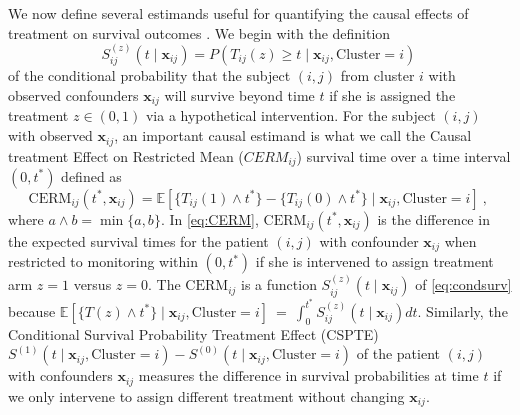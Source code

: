 \documentclass[aoas]{imsart}
\theoremstyle{plain}
\theoremstyle{definition}
\begin{document}
We now define several estimands useful for quantifying the causal  effects of treatment  on survival outcomes \parencite{Andersen2021observational}. %
We begin with the definition 
\begin{equation}
S_{ij}^{(z)}(t \mid   \mathbf{x}_{ij}) = P(T_{ij}(z) \geq t \mid   \mathbf{x}_{ij}, \text{Cluster}=i) \hspace{2pt}
\label{eq:condsurv}
\end{equation}
of the conditional probability that the subject $(i,j)$ from cluster $i$ with observed confounders $\mathbf{x}_{ij}$ will survive beyond time $t$ 
if she is  assigned the treatment $z\in (0,1)$ via a hypothetical intervention. 
For the subject $(i,j)$ with observed $\mathbf{x}_{ij}$, an important causal estimand is what we call the Causal treatment Effect on Restricted Mean ($CERM_{ij}$) survival time over a time interval $(0,t^*)$ defined as 
\begin{equation}
\text{CERM}_{ij}(t^*, \mathbf{x}_{ij}) = \mathbb{E}[\{T_{ij}(1)\wedge t^*\} - \{T_{ij}(0)\wedge t^*\} \mid   \mathbf{x}_{ij}, \text{Cluster}=i]\ ,
\hspace{2pt}
\label{eq:CERM}
\end{equation}
where $a\wedge b=\min\{a,b\}$. In \eqref{eq:CERM}, $\text{CERM}_{ij}(t^*, \mathbf{x}_{ij})$  is the difference  in the expected survival times for the patient $(i,j)$ with confounder $\mathbf{x}_{ij}$ when 
restricted to monitoring within $(0,t^*)$ if she is intervened to assign treatment arm $z=1$ versus $z=0$. 
The $\text{CERM}_{ij}$  is a function $S_{ij}^{(z)}(t \mid   \mathbf{x}_{ij})$ of \eqref{eq:condsurv} because $\mathbb{E}[\{T(z) \wedge t^*\}  \mid   \mathbf{x}_{ij}, \text{Cluster}=i]\   
=\ \int_0^{t^*} S_{ij}^{(z)}(t \mid   \mathbf{x}_{ij}) dt$.
Similarly, the Conditional Survival Probability Treatment Effect (CSPTE)  $ S^{(1)}(t \mid   \mathbf{x}_{ij}, \text{Cluster}=i) - S^{(0)}(t \mid   \mathbf{x}_{ij}, \text{Cluster}=i)$ of the patient $(i,j)$ with confounders $\mathbf{x}_{ij}$  measures the difference in survival probabilities at time $t$ if we only intervene to assign different treatment without changing $\mathbf{x}_{ij}$.
\end{document}
